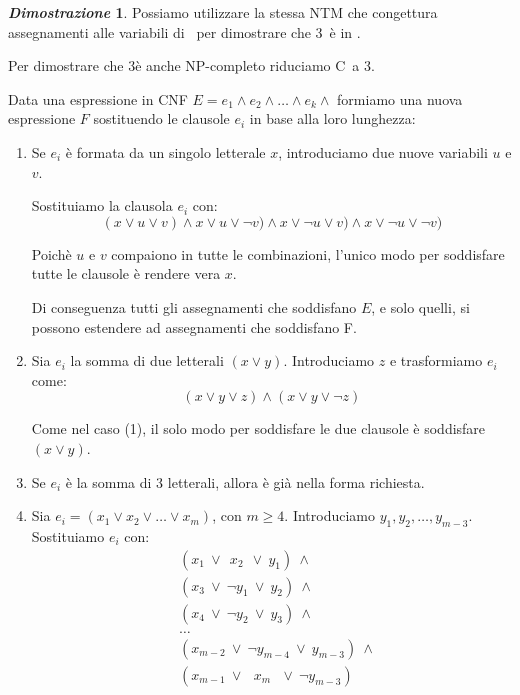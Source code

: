 \documentclass[12pt]{article}
\theoremstyle{definition}
\newtheorem*{myproof}{\em Dimostrazione}
\begin{document}
\begin{myproof}
  Possiamo utilizzare la stessa NTM che congettura assegnamenti alle variabili di \SAT\ per
  dimostrare che 3\SAT\ \`e in \NP.

  Per dimostrare che 3\SAT \`e anche NP-completo riduciamo C\SAT\ a 3\SAT.

  Data una espressione in CNF \(E = e_1 \land e_2 \land \ldots \land e_k \land\) formiamo una
  nuova espressione \(F\) sostituendo le clausole \(e_i\) in base alla loro lunghezza:

  \begin{enumerate}

    \item Se \(e_i\) \`e formata da un singolo letterale \(x\), introduciamo due nuove variabili
      \(u\) e \(v\).\newline

      Sostituiamo la clausola \(e_i\) con:\[
      (x \lor u \lor v) \land x \lor u \lor \lnot v) \land x \lor \lnot u \lor v) \land x \lor \lnot u \lor \lnot v)
      \]

      Poich\`e \(u\) e \(v\) compaiono in tutte le combinazioni, l'unico modo per soddisfare tutte le clausole \`e rendere
      vera \(x\).\newline

      Di conseguenza tutti gli assegnamenti che soddisfano \(E\), e solo quelli, si possono estendere ad assegnamenti che
      soddisfano F.\newline

    \item Sia \(e_i\) la somma di due letterali \((x \lor y)\). Introduciamo \(z\) e trasformiamo \(e_i\) come:\[
      (x \lor y \lor z) \land (x \lor y \lor \lnot z)
      \]

      Come nel caso (1), il solo modo per soddisfare le due clausole \`e soddisfare \((x \lor y)\).\newline

    \item Se \(e_i\) \`e la somma di 3 letterali, allora \`e gi\`a nella forma richiesta.\newline

    \item Sia \(e_i = (x_1 \lor x_2 \lor \ldots \lor x_m)\), con \(m \geq 4\). Introduciamo \(y_1, y_2, \ldots, y_{m-3}\).
      Sostituiamo \(e_i\) con:\[
      \begin{aligned}
        &(x_1\ \lor\ \ x_2\ \ \lor\ y_1)\ \land \\
        &(x_3\ \lor\ \lnot y_1\ \lor\ y_2)\ \land \\
        &(x_4\ \lor\ \lnot y_2\ \lor\ y_3)\ \land \\
        &\ldots \\
        &(x_{m-2}\ \lor\ \lnot y_{m-4}\ \lor\ y_{m-3})\ \land \\
        &(x_{m-1}\ \lor\ \ \ x_m\ \ \ \lor\ \lnot y_{m-3})
      \end{aligned}
      \]


\end{enumerate}
\end{myproof}
\end{document}
